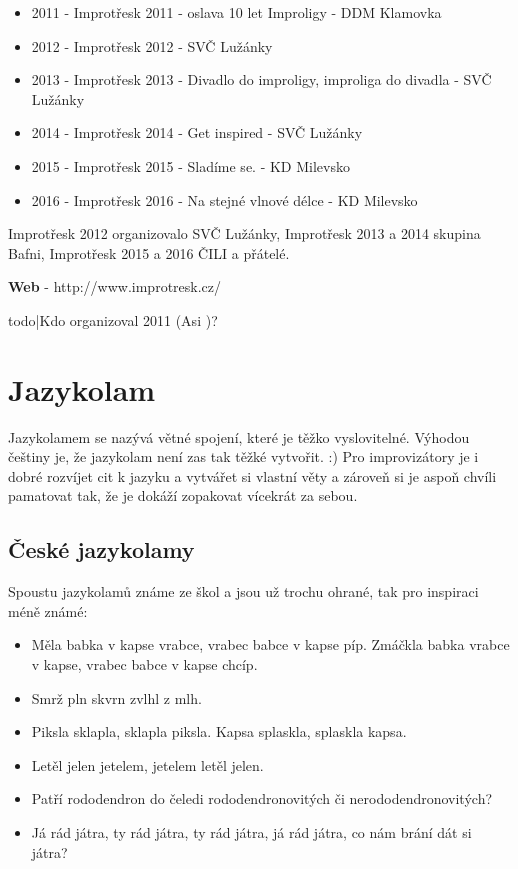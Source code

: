 \documentclass[main.tex]{subfiles}
\begin{document}
\begin{itemize}
\item 2011 - Improtřesk 2011 - oslava 10 let Improligy - DDM Klamovka
\item 2012 - Improtřesk 2012 - SVČ Lužánky
\item 2013 - Improtřesk 2013 - Divadlo do improligy, improliga do divadla - SVČ Lužánky
\item 2014 - Improtřesk 2014 - Get inspired - SVČ Lužánky
\item 2015 - Improtřesk 2015 - Sladíme se.   - KD Milevsko
\item 2016 - Improtřesk 2016 - Na stejné vlnové délce - KD Milevsko
\end{itemize}
 
Improtřesk 2012 organizovalo SVČ Lužánky,  
Improtřesk 2013 a 2014 skupina Bafni, Improtřesk 2015 a 2016  ČILI a přátelé. 
 
\textbf{Web}{} - http://www.improtresk.cz/ 
 
{{todo|Kdo organizoval 2011 (Asi )?}} 
\needspace{5cm} \section{Jazykolam} \label{jazykolam} Jazykolamem se nazývá větné spojení, které je těžko vyslovitelné. Výhodou češtiny je, že jazykolam není zas tak těžké vytvořit. :) 
Pro improvizátory je i dobré rozvíjet cit k jazyku a vytvářet si vlastní věty a zároveň si je aspoň chvíli pamatovat tak, že je dokáží zopakovat vícekrát za sebou. 
 
 
\subsection{ České jazykolamy }  
Spoustu jazykolamů známe ze škol a jsou už trochu ohrané, tak pro inspiraci méně známé: 
 
\begin{itemize}
\item  Měla babka v kapse vrabce, vrabec babce v kapse píp. Zmáčkla babka vrabce v kapse, vrabec babce v kapse chcíp.
\item  Smrž pln skvrn zvlhl z mlh.
\item  Piksla sklapla, sklapla piksla. Kapsa splaskla, splaskla kapsa.
\item  Letěl jelen jetelem, jetelem letěl jelen.
\item  Patří rododendron do čeledi rododendronovitých či nerododendronovitých?
\item  Já rád játra, ty rád játra, ty rád játra, já rád játra, co nám brání dát si játra?
\end{itemize}
 
\end{document}
